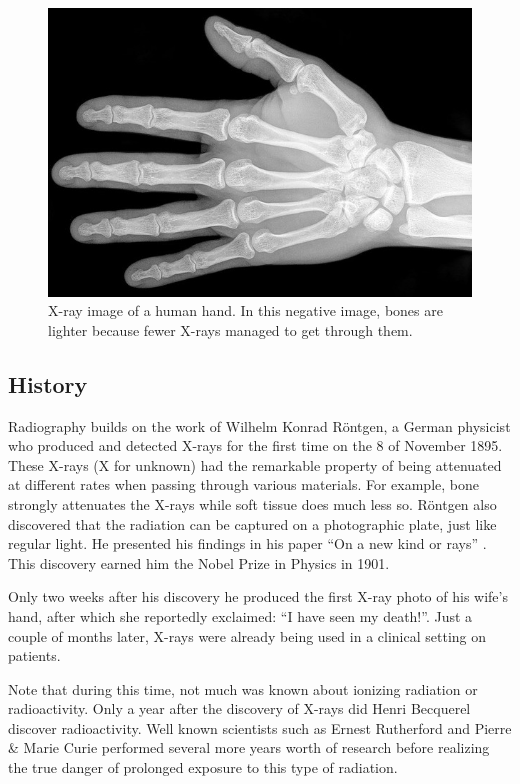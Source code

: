 \begin{figure}[ht]
\begin{center}
  \includegraphics[width=\linewidth]{img/xrayhand.jpg}
  \caption{X-ray image of a human hand. In this negative image, bones are
  lighter because fewer X-rays managed to get through them.}
  \label{fig:xrayhand}
\end{center}
\end{figure}

\subsection{History}
Radiography builds on the work of Wilhelm Konrad R\"ontgen, a German physicist
who produced and detected X-rays for the first time on the 8 of November 1895.
These X-rays (X for unknown) had the remarkable property of being attenuated at
different rates when passing through various materials. For example, bone
strongly attenuates the X-rays while soft tissue does much less so. R\"ontgen
also discovered that the radiation can be captured on a photographic plate, just
like regular light. He presented his findings in his paper ``On a new kind or
rays'' \cite{rontgen}. This discovery earned him the Nobel Prize in Physics in
1901.

Only two weeks after his discovery he produced the first X-ray photo of his
wife's hand, after which she reportedly exclaimed: ``I have seen my death!''.
Just a couple of months later, X-rays were already being used in a clinical
setting on patients.

Note that during this time, not much was known about ionizing radiation or
radioactivity. Only a year after the discovery of X-rays did Henri Becquerel
discover radioactivity. Well known scientists such as Ernest Rutherford and
Pierre \& Marie Curie performed several more years worth of research before
realizing the true danger of prolonged exposure to this type of radiation.


